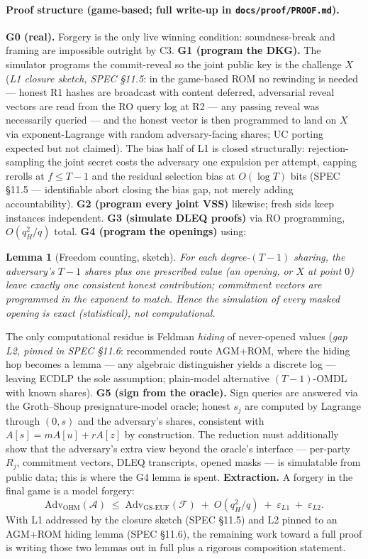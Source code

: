\documentclass[11pt]{article}
\theoremstyle{plain}
\newtheorem{lemma}{Lemma}
\theoremstyle{definition}
\theoremstyle{remark}
\newcommand{\share}[1]{[#1]}
\newcommand{\sid}{\mathrm{sid}}
\begin{document}
\paragraph{Proof structure (game-based; full write-up in \texttt{docs/proof/PROOF.md}).}
\textbf{G0 (real).} Forgery is the only live winning condition: soundness-break and framing are impossible outright by C3.
\textbf{G1 (program the DKG).} The simulator programs the commit-reveal so the joint public key is the challenge $X$ (\emph{L1 closure sketch, SPEC \S11.5}: in the game-based ROM no rewinding is needed --- honest R1 hashes are broadcast with content deferred, adversarial reveal vectors are read from the RO query log at R2 --- any passing reveal was necessarily queried --- and the honest vector is then programmed to land on $X$ via exponent-Lagrange with random adversary-facing shares; UC porting expected but not claimed). The bias half of L1 is closed structurally: rejection-sampling the joint secret costs the adversary one expulsion per attempt, capping rerolls at $f \leq T{-}1$ and the residual selection bias at $O(\log T)$ bits (SPEC \S11.5 --- identifiable abort closing the bias gap, not merely adding accountability).
\textbf{G2 (program every joint VSS)} likewise; fresh $\sid$s keep instances independent.
\textbf{G3 (simulate DLEQ proofs)} via RO programming, $O(q_H^2/q)$ total.
\textbf{G4 (program the openings)} using:

\begin{lemma}[Freedom counting, sketch]\label{lem:freedom}
For each degree-$(T{-}1)$ sharing, the adversary's $T{-}1$ shares plus one prescribed value (an opening, or $X$ at point $0$) leave exactly one consistent honest contribution; commitment vectors are programmed in the exponent to match. Hence the simulation of every masked opening is exact (statistical), not computational.
\end{lemma}

\noindent The only computational residue is Feldman \emph{hiding} of never-opened values (\emph{gap L2, pinned in SPEC \S11.6}: recommended route AGM+ROM, where the hiding hop becomes a lemma --- any algebraic distinguisher yields a discrete log --- leaving ECDLP the sole assumption; plain-model alternative $(T{-}1)$-OMDL with known shares).
\textbf{G5 (sign from the oracle).} Sign queries are answered via the Groth--Shoup presignature-model oracle; honest $s_j$ are computed by Lagrange through $(0, s)$ and the adversary's shares, consistent with $A\share{s} = m A\share{u} + r A\share{z}$ by construction. The reduction must additionally show that the adversary's extra view beyond the oracle's interface --- per-party $R_j$, commitment vectors, DLEQ transcripts, opened masks --- is simulatable from public data; this is where the G4 lemma is spent.
\textbf{Extraction.} A forgery in the final game is a model forgery:
\[
\mathrm{Adv}_{\mathrm{OHM}}(\mathcal{A}) \;\leq\; \mathrm{Adv}_{\mathrm{GS\text{-}EUF}}(\mathcal{F}) \;+\; O(q_H^2/q) \;+\; \varepsilon_{L1} \;+\; \varepsilon_{L2}.
\]
With L1 addressed by the closure sketch (SPEC \S11.5) and L2 pinned to an AGM+ROM hiding lemma (SPEC \S11.6), the remaining work toward a full proof is writing those two lemmas out in full plus a rigorous composition statement.
\end{document}
